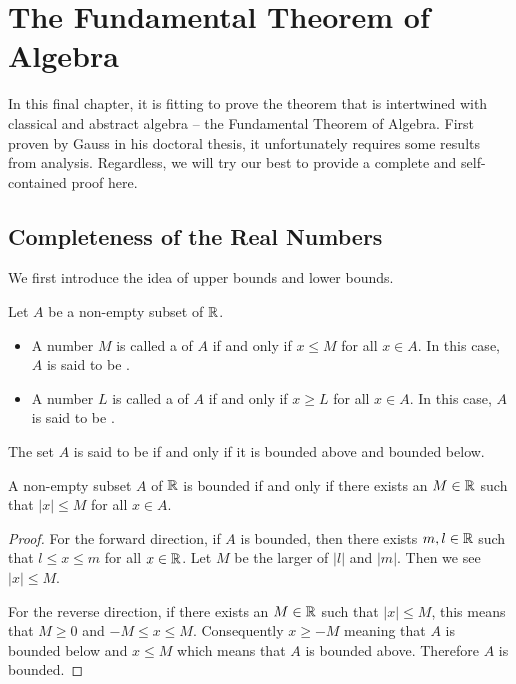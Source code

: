 \chapter{The Fundamental Theorem of Algebra}
In this final chapter, it is fitting to prove the theorem that is intertwined with classical and abstract algebra -- the Fundamental Theorem of Algebra. First proven by Gauss in his doctoral thesis, it unfortunately requires some results from analysis. Regardless, we will try our best to provide a complete and self-contained proof here.

\section{Completeness of the Real Numbers}
We first introduce the idea of upper bounds and lower bounds.

\begin{definition}
    Let $A$ be a non-empty subset of $\mathbb{R}$.
    \begin{itemize}
        \item A number $M$ is called a  of $A$ if and only if $x \leq M$ for all $x \in A$. In this case, $A$ is said to be .
        \item A number $L$ is called a  of $A$ if and only if $x \geq L$ for all $x \in A$. In this case, $A$ is said to be .
    \end{itemize}
    The set $A$ is said to be  if and only if it is bounded above and bounded below.
\end{definition}

\begin{proposition}
    A non-empty subset $A$ of $\mathbb{R}$ is bounded if and only if there exists an $M \in \mathbb{R}$ such that $|x| \leq M$ for all $x \in A$.
\end{proposition}
\begin{proof}
    For the forward direction, if $A$ is bounded, then there exists $m, l \in \mathbb{R}$ such that $l \leq x \leq m$ for all $x \in \mathbb{R}$. Let $M$ be the larger of $|l|$ and $|m|$. Then we see $|x| \leq M$.

    For the reverse direction, if there exists an $M \in \mathbb{R}$ such that $|x| \leq M$, this means that $M \geq 0$ and $-M \leq x \leq M$. Consequently $x \geq -M$ meaning that $A$ is bounded below and $x \leq M$ which means that $A$ is bounded above. Therefore $A$ is bounded.
\end{proof}

